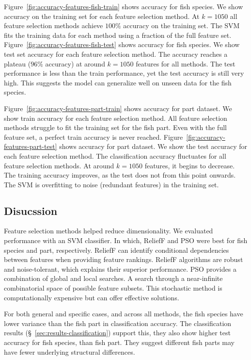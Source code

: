 \documentclass[runningheads]{llncs}
\begin{document}
Figure~\ref{fig:accuracy-features-fish-train} shows accuracy for fish species.
We show accuracy on the training set for each feature selection method.
At $k=1050$ all feature selection methods achieve $100\%$ accuracy on the training set.
The SVM fits the training data for each method using a fraction of the full feature set.
Figure~\ref{fig:accuracy-features-fish-test} shows accuracy for fish species.
We show test set accuracy for each feature selection method.
The accuracy reaches a plateau ($96\%$ accuracy) at around $k=1050$ features for all methods.
The test performance is less than the train performance, yet the test accuracy is still very high.
This suggests the model can generalize well on unseen data for the fish species.

Figure~\ref{fig:accuracy-features-part-train} shows accuracy for part dataset.
We show train accuracy for each feature selection method.
All feature selection methods struggle to fit the training set for the fish part.
Even with the full feature set, a perfect train accuracy is never reached.
Figure~\ref{fig:accuracy-features-part-test} shows accuracy for part dataset.
We show the test accuracy for each feature selection method.
The classification accuracy fluctuates for all feature selection methods.
At around $k=1050$ features, it begins to decrease.
The training accuracy improves, as the test does not from this point onwards.
The SVM is overfitting to noise (redundant features) in the training set.

\subsection{Disucssion}
\label{sec:results-feature-selection-discussion}

Feature selection methods helped reduce dimensionality.
We evaluated performance with an SVM classifier.
In which, ReliefF and PSO were best for fish species and part, respectively.
ReliefF can identify conditional dependencies between features when providing feature rankings.
ReliefF algorithms are robust and noise-tolerant, which explains their superior performance.
PSO provides a combination of global and local searches.
A search through a near-infinite combinatorial space of possible feature subsets.
This stochastic method is computationally expensive but can offer effective solutions.

For both general and specific cases, and across all methods, the fish species have lower variance than the fish part in classification accuracy.
The classification results (\S~\ref{sec:results-classification}) support this, they also show higher test accuracy for fish species, than fish part.
They suggest different fish parts may have fewer underlying structural differences.
\end{document}
